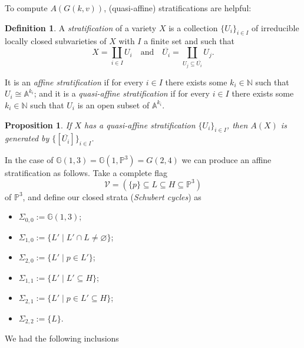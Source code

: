 \documentclass[12pt,a4paper]{amsart}
\theoremstyle{plain}
\newtheorem{prop}[thm]{Proposition}
\theoremstyle{definition}
\newtheorem{defn}[thm]{Definition}
\theoremstyle{remark}
\begin{document}
To compute $A(G(k,v))$, (quasi-affine) stratifications are helpful:

\begin{defn}
    A \textit{stratification} of a variety $X$ is a collection $\{U_{i}\}_{i\in I}$ of irreducible locally closed subvarieties of $X$ with $I$ a finite set and such that
    \[ X=\coprod_{i\in I}U_{i} \quad\text{and}\quad \overline{U_{i}}=\coprod_{U_{j}\subseteq \overline{U_{i}}}U_{j}. \]
\end{defn}

It is an \textit{affine stratification} if for every $i\in I$ there exists some $k_{i}\in \mathbb{N}$ such that $U_{i}\cong \mathbb{A}^{k_{i}}$; and it is a \textit{quasi-affine stratification} if for every $i\in I$ there exists some $k_{i}\in \mathbb{N}$ such that $U_{i}$ is an open subset of $\mathbb{A}^{k_{i}}$.

\begin{prop}
    If $X$ has a quasi-affine stratification $\{ U_{i}\}_{i\in I}$, then $A(X)$ is generated by $\{ [\overline{U_{i}}]\}_{i\in I}$.
\end{prop}

In the case of $\mathbb{G}(1,3)=\mathbb{G}(1,\mathbb{P}^{3})=G(2,4)$ we can produce an affine stratification as follows.
Take a complete flag
\[ \mathcal{V}=\left( \{ p\} \subseteq L\subseteq H\subseteq \mathbb{P}^{3}\right) \]
of $\mathbb{P}^{3}$, and define our closed strata (\textit{Schubert cycles}) as

\begin{itemize}
    \item $\Sigma_{0,0}:=\mathbb{G}(1,3)$;
    \item $\Sigma_{1,0}:=\{ L'\mid L' \cap L\neq \varnothing \}$;
    \item $\Sigma_{2,0}:=\{ L'\mid p\in L'\}$;
    \item $\Sigma_{1,1}:=\{ L'\mid L'\subseteq H\}$;
    \item $\Sigma_{2,1}:=\{ L'\mid p\in L'\subseteq H\}$;
    \item $\Sigma_{2,2}:=\{L\}$.
\end{itemize}

We had the following inclusions
\begin{center}
\end{center}
\end{document}
